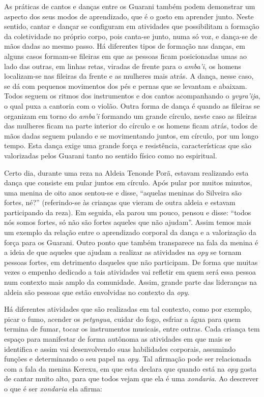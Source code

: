 As práticas de cantos e danças entre os Guarani também podem demonstrar
um aspecto dos seus modos de aprendizado, que é o gosto em aprender
junto. Neste sentido, cantar e dançar se configuram em atividades que
possibilitam a formação da coletividade no próprio corpo, pois canta-se
junto, numa só voz, e dança-se de mãos dadas ao mesmo passo. Há
diferentes tipos de formação nas danças, em alguns casos formam-se
fileiras em que as pessoas ficam posicionadas umas ao lado das outras,
em linhas retas, viradas de frente para o \emph{amba’i}, os homens
localizam-se nas fileiras da frente e as mulheres mais atrás. A dança,
nesse caso, se dá com pequenos movimentos dos pés e pernas que se
levantam e abaixam. Todos seguem os ritmos dos instrumentos e dos
cantos acompanhando o \emph{yvyra’ija}, o qual puxa a cantoria com o violão.
Outra forma de dança é quando as fileiras se organizam em torno do
\emph{amba’i} formando um grande círculo, neste caso as fileiras das mulheres
ficam na parte interior do círculo e os homens ficam atrás, todos de
mãos dadas seguem pulando e se movimentando juntos, em círculo, por um
longo tempo. Esta dança exige uma grande força e resistência,
características que são valorizadas pelos Guarani tanto no sentido
físico como no espiritual.

Certo dia, durante uma reza na Aldeia Tenonde Porã, estavam realizando
esta dança que consiste em pular juntos em círculo. Após pular por
muitos minutos, uma menina de oito anos sentou-se e disse, ``aquelas
meninas do Silveira são fortes, né?'' (referindo-se às crianças que
vieram de outra aldeia e estavam participando da reza). Em seguida, ela
parou um pouco, pensou e disse: ``todos nós somos fortes, só não são
fortes aqueles que não ajudam''. Assim temos mais um exemplo da relação
entre o aprendizado corporal da dança e a valorização da força para os
Guarani. Outro ponto que também transparece na fala da menina é a ideia
de que aqueles que ajudam a realizar as atividades na \emph{opy} se tornam
pessoas fortes, em detrimento daqueles que não participam. De forma que
muitas vezes o empenho dedicado a tais atividades vai refletir em quem
será essa pessoa num contexto mais amplo da comunidade. Assim, grande
parte das lideranças na aldeia são pessoas que estão envolvidas no
contexto da \emph{opy}.

Há diferentes atividades que são realizadas em tal contexto, como por
exemplo, picar o fumo, acender os \emph{petyngua}, cuidar do fogo, esfriar a
água para quem termina de fumar, tocar os instrumentos musicais, entre
outras. Cada criança tem espaço para manifestar de forma autônoma as
atividades em que mais se identifica e assim vai desenvolvendo suas
habilidades corporais, assumindo funções e determinando o seu papel na
\emph{opy}. Tal afirmação pode ser relacionada com a fala da menina Kerexu, em
que esta declara que quando está na \emph{opy} gosta de cantar muito alto,
para que todos vejam que ela é uma \emph{xondaria}. Ao descrever o que é ser
\emph{xondaria} ela afirma:

